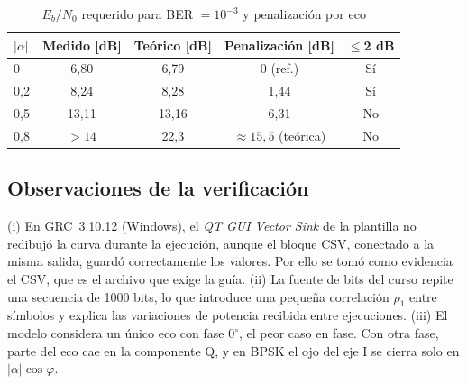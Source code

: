 \begin{table}[!t]
\centering
\caption{$E_b/N_0$ requerido para BER $=10^{-3}$ y penalización por eco}
\label{tab:penalizacion}
\footnotesize
\begin{tabular}{lcccc}
\toprule
$|\alpha|$ & \textbf{Medido} [dB] & \textbf{Teórico} [dB] & \textbf{Penalización} [dB] & \textbf{$\le$2 dB} \\
\midrule
0   & 6,80 & 6,79 & 0 (ref.) & Sí \\
0,2 & 8,24 & 8,28 & 1,44 & Sí \\
0,5 & 13,11 & 13,16 & 6,31 & No \\
0,8 & $>14$ & 22,3 & $\approx15{,}5$ (teórica) & No \\
\bottomrule
\end{tabular}
\end{table}

\subsection{Observaciones de la verificación}
(i) En GRC~3.10.12 (Windows), el \emph{QT GUI Vector Sink} de la plantilla no redibujó la curva durante la ejecución, aunque el bloque CSV, conectado a la misma salida, guardó correctamente los valores. Por ello se tomó como evidencia el CSV, que es el archivo que exige la guía. (ii) La fuente de bits del curso repite una secuencia de 1000 bits, lo que introduce una pequeña correlación $\rho_1$ entre símbolos y explica las variaciones de potencia recibida entre ejecuciones. (iii) El modelo considera un único eco con fase $0^\circ$, el peor caso en fase. Con otra fase, parte del eco cae en la componente Q, y en BPSK el ojo del eje I se cierra solo en $|\alpha|\cos\varphi$.
